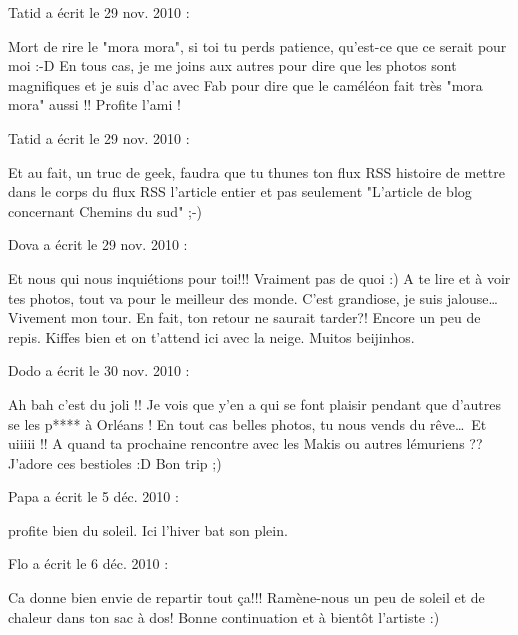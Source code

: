 \medskip
Tatid a écrit le 29 nov. 2010 :
\begin{displayquote}
Mort de rire le "mora mora", si toi tu perds patience, qu'est-ce que ce serait pour moi :-D
En tous cas, je me joins aux autres pour dire que les photos sont magnifiques et je suis d'ac avec Fab pour dire que le caméléon fait très "mora mora" aussi !!
Profite l'ami !
\end{displayquote}

\medskip
Tatid a écrit le 29 nov. 2010 :
\begin{displayquote}
Et au fait, un truc de geek, faudra que tu thunes ton flux RSS histoire de mettre dans le corps du flux RSS l'article entier et pas seulement "L'article de blog concernant Chemins du sud" ;-)
\end{displayquote}

\medskip
Dova a écrit le 29 nov. 2010 :
\begin{displayquote}
Et nous qui nous inquiétions pour toi!!!
Vraiment pas de quoi :)
A te lire et à voir tes photos, tout va pour le meilleur des monde.
C'est grandiose, je suis jalouse\dots Vivement mon tour.
En fait, ton retour ne saurait tarder?! Encore un peu de repis. Kiffes bien et on t'attend ici avec la neige.
Muitos beijinhos.
\end{displayquote}

\medskip
Dodo a écrit le 30 nov. 2010 :
\begin{displayquote}
Ah bah c'est du joli !! Je vois que y'en a qui se font plaisir pendant que d'autres se les p**** à Orléans !
En tout cas belles photos, tu nous vends du rêve\dots Et uiiiii !! A quand ta prochaine rencontre avec les Makis ou autres lémuriens ?? J'adore ces bestioles :D
Bon trip ;)
\end{displayquote}

\medskip
Papa a écrit le 5 déc. 2010 :
\begin{displayquote}
profite bien du soleil. Ici l'hiver bat son plein.
\end{displayquote}

\medskip
Flo a écrit le 6 déc. 2010 :
\begin{displayquote}
Ca donne bien envie de repartir tout ça!!!
Ramène-nous un peu de soleil et de chaleur dans ton sac à dos!
Bonne continuation et à bientôt l'artiste :)
\end{displayquote}

\vfill
